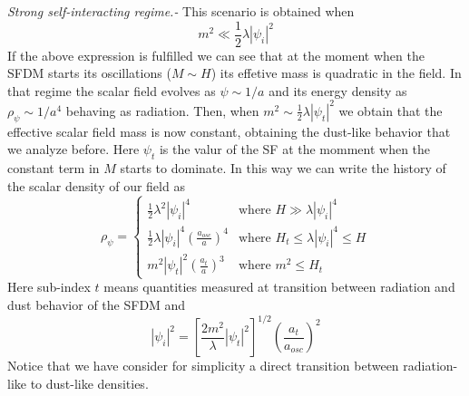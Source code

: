 \documentclass[twocolumn,           %
               showpacs,            %
               preprintnumbers,     %
               aps,                 %
               prl,          	    %
               letterpaper,             %
               superscriptaddress,      %
               nofootinbib,         %
               tightenlines,        %
               floats,floatfix      %
               ,usenatbib,
               ]{revtex4-1}
\begin{document}
\textit{Strong self-interacting regime.-} This scenario is obtained when 
\begin{equation}
m^2\ll \frac{1}{2}\lambda|\psi_i|^2
\end{equation}
If the above expression is fulfilled we can see that at the moment when the SFDM starts its oscillations ($M\sim H$) its effetive mass is quadratic in the field. In that regime the scalar field evolves as $\psi\sim 1/a$ and its energy density as $\rho_{\psi}\sim 1/a^4$ behaving as radiation. Then, when $m^2 \sim \frac{1}{2}\lambda|\psi_t|^2$ we obtain that the effective scalar field mass is now constant, obtaining the dust-like behavior that we analyze before. Here $\psi_t$ is the valur of the SF at the momment when the constant term in $M$ starts to dominate. In this way we can write the history of the scalar density of our field as
\begin{equation}\label{rhosfdmlam}
\rho_\psi = \left\lbrace\begin{array}{ll}
\frac{1}{2}\lambda^2|\psi_i|^4 & \text{where }H\gg \lambda|\psi_i|^4 \\
\frac{1}{2}\lambda|\psi_i|^4\left(\frac{a_{osc}}{a}\right)^4 & \text{where }H_t\leq \lambda|\psi_i|^4\leq H\\
m^2|\psi_t|^2\left(\frac{a_t}{a}\right)^3 & \text{where } m^2\leq H_t
\end{array}\right .
\end{equation}
Here sub-index $t$ means quantities measured at transition between radiation and dust behavior of the SFDM and
\begin{equation}\label{inilamb}
|\psi_i|^2=\left[\frac{2m^2}{\lambda}|\psi_t|^2\right]^{1/2}\left(\frac{a_t}{a_{osc}}\right)^2
\end{equation}
Notice that we have consider for simplicity a direct transition between radiation-like to dust-like densities. 
\end{document}
